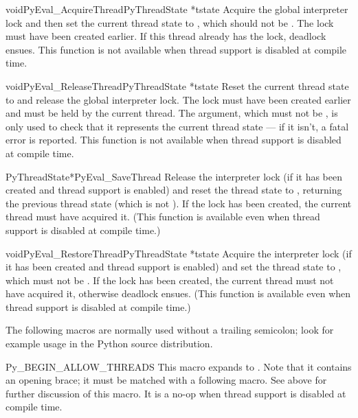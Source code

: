 \begin{cfuncdesc}{void}{PyEval_AcquireThread}{PyThreadState *tstate}
  Acquire the global interpreter lock and then set the current thread
  state to , which should not be \NULL.  The lock must
  have been created earlier.  If this thread already has the lock,
  deadlock ensues.  This function is not available when thread support
  is disabled at compile time.
\end{cfuncdesc}

\begin{cfuncdesc}{void}{PyEval_ReleaseThread}{PyThreadState *tstate}
  Reset the current thread state to \NULL{} and release the global
  interpreter lock.  The lock must have been created earlier and must
  be held by the current thread.  The  argument, which
  must not be \NULL, is only used to check that it represents the
  current thread state --- if it isn't, a fatal error is reported.
  This function is not available when thread support is disabled at
  compile time.
\end{cfuncdesc}

\begin{cfuncdesc}{PyThreadState*}{PyEval_SaveThread}{}
  Release the interpreter lock (if it has been created and thread
  support is enabled) and reset the thread state to \NULL, returning
  the previous thread state (which is not \NULL).  If the lock has
  been created, the current thread must have acquired it.  (This
  function is available even when thread support is disabled at
  compile time.)
\end{cfuncdesc}

\begin{cfuncdesc}{void}{PyEval_RestoreThread}{PyThreadState *tstate}
  Acquire the interpreter lock (if it has been created and thread
  support is enabled) and set the thread state to , which
  must not be \NULL.  If the lock has been created, the current thread
  must not have acquired it, otherwise deadlock ensues.  (This
  function is available even when thread support is disabled at
  compile time.)
\end{cfuncdesc}

The following macros are normally used without a trailing semicolon;
look for example usage in the Python source distribution.

\begin{csimplemacrodesc}{Py_BEGIN_ALLOW_THREADS}
  This macro expands to
  .
  Note that it contains an opening brace; it must be matched with a
  following  macro.  See above for
  further discussion of this macro.  It is a no-op when thread support
  is disabled at compile time.
\end{csimplemacrodesc}

